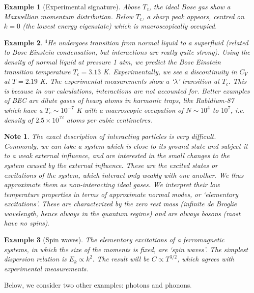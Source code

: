 \documentclass[a4paper]{article}
\newtheorem{eg}{Example}[section]
\newtheorem{Note}{Note}[section]
\theoremstyle{new}
\begin{document}
\begin{eg}[Experimental signature]
Above $T_c$, the ideal Bose gas show a Maxwellian momentum distribution. Below $T_c$, a sharp peak appears, centred on $k=0$ (the lowest energy eigenstate) which is macroscopically occupied.
\end{eg}
\begin{eg}
$^4$He undergoes transition from normal liquid to a superfluid (related to Bose Einstein condensation, but interactions are really quite strong). Using the density of normal liquid at pressure 1 atm, we predict the Bose Einstein transition temperature $T_c=3.13$ K. Experimentally, we see a discontinuity in $C_V$ at $T=2.19$ K. The experimental measurements show a `$\lambda$' transition at $T_c$. This is because in our calculations, interactions are not accounted for. Better examples of BEC are dilute gases of heavy atoms in harmonic traps, like Rubidium-87 which have a $T_c\sim 10^{-7}$ K with a macroscopic occupation of $N\sim10^4$ to $10^7$, i.e. density of $2.5\times10^{12}$ atoms per cubic centimetres. 
\end{eg}
\begin{Note}
The exact description of interacting particles is very difficult. Commonly, we can take a system which is close to its ground state and subject it to a weak external influence, and are interested in the small changes to the system caused by the external influence. These are the excited states or excitations of the system, which interact only weakly with one another. We thus approximate them as non-interacting ideal gases. We interpret their low temperature properties in terms of approximate normal modes, or `elementary excitations'. These are characterized by the zero rest mass (infinite de Broglie wavelength, hence always in the quantum regime) and are always bosons (most have no spins).
\end{Note}
\begin{eg}[Spin waves]
The elementary excitations of a ferromagnetic systems, in which the size of the moments is fixed, are `spin waves'. The simplest dispersion relation is $E_k\propto k^2$. The result will be $C\propto T^{3/2}$, which agrees with experimental measurements.
\end{eg}
Below, we consider two other examples: photons and phonons.
\end{document}
